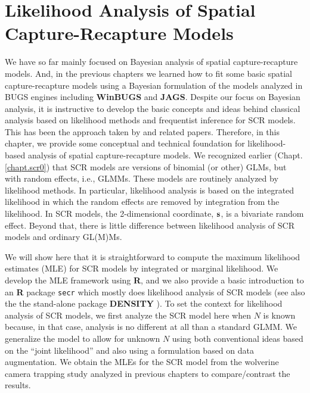 \chapter{
Likelihood Analysis of Spatial Capture-Recapture Models
}
\label{chapt.mle}

\vspace{.3in}

We have so far mainly focused on Bayesian analysis of spatial
capture-recapture models. And, in the previous chapters we learned how
to fit some basic spatial capture-recapture models using a Bayesian
formulation of the models analyzed in BUGS engines including {\bf
  WinBUGS} and {\bf JAGS}.  Despite our focus on Bayesian analysis, it
is instructive to develop the basic concepts and ideas behind
classical analysis based on likelihood methods and frequentist
inference for SCR models. This has been the approach taken by
\citet{borchers_efford:2008, dawson_efford:2009} and related papers.
Therefore, in this chapter, we provide some conceptual and technical
foundation for likelihood-based analysis of spatial capture-recapture
models. We recognized earlier (Chapt. \ref{chapt.scr0}) that SCR
models are versions of binomial (or other) GLMs, but with random
effects, i.e., GLMMs. These models are routinely analyzed by
likelihood methods. In particular, likelihood analysis is based on the
integrated likelihood in which the random effects are removed by
integration from the likelihood. In SCR models, the 2-dimensional
coordinate, ${\bf s}$, is a bivariate random effect. Beyond that,
there is little difference between likelihood analysis of SCR models
and ordinary GL(M)Ms.

We will show here that it is straightforward to compute the maximum
likelihood estimates (MLE) for SCR models by integrated or marginal
likelihood. We develop the MLE framework using {\bf R}, and we also
provide a basic introduction to an {\bf R} package \mbox{\tt secr}
\citep{efford:2011} which mostly does likelihood analysis of SCR
models (see also the the stand-alone package {\bf DENSITY}
\citep{efford_etal:2004}).  To set the context for likelihood analysis
of SCR models, we first analyze the SCR model here when $N$ is known
because, in that case, analysis is no different at all than a standard
GLMM.
We generalize the model to allow for unknown $N$
using both conventional ideas based on the ``joint likelihood''
\citep[e.g.,][]{borchers_etal:2002} and also using a formulation based
on data augmentation.  We obtain the MLEs for the SCR model from the
wolverine camera trapping study \citep{magoun_etal:2011} analyzed in
previous chapters to compare/contrast the results.

